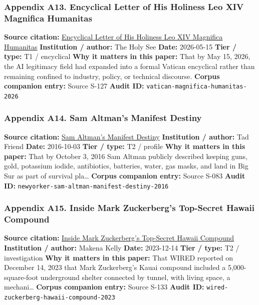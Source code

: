 \documentclass[
  american,
  11pt,
  letterpaper,
]{article}
\begin{document}
\subsubsection{Appendix A13. Encyclical Letter of His Holiness Leo XIV
Magnifica
Humanitas}\label{appendix-a13-encyclical-letter-of-his-holiness-leo-xiv-magnifica-humanitas}

\textbf{Source citation:}
\href{https://www.vatican.va/content/leo-xiv/en/encyclicals/documents/20260515-magnifica-humanitas.html}{Encyclical
Letter of His Holiness Leo XIV Magnifica Humanitas} \textbf{Institution
/ author:} The Holy See \textbf{Date:} 2026-05-15 \textbf{Tier / type:}
T1 / encyclical \textbf{Why it matters in this paper:} That by May 15,
2026, the AI legitimacy field had expanded into a formal Vatican
encyclical rather than remaining confined to industry, policy, or
technical discourse. \textbf{Corpus companion entry:} Source S-127
\textbf{Audit ID:} \texttt{vatican-magnifica-humanitas-2026}

\subsubsection{Appendix A14. Sam Altman's Manifest
Destiny}\label{appendix-a14-sam-altman-s-manifest-destiny}

\textbf{Source citation:}
\href{https://www.newyorker.com/magazine/2016/10/10/sam-altmans-manifest-destiny}{Sam
Altman's Manifest Destiny} \textbf{Institution / author:} Tad Friend
\textbf{Date:} 2016-10-03 \textbf{Tier / type:} T2 / profile \textbf{Why
it matters in this paper:} That by October 3, 2016 Sam Altman publicly
described keeping guns, gold, potassium iodide, antibiotics, batteries,
water, gas masks, and land in Big Sur as part of survival pla\ldots{}
\textbf{Corpus companion entry:} Source S-083 \textbf{Audit ID:}
\texttt{newyorker-sam-altman-manifest-destiny-2016}

\subsubsection{Appendix A15. Inside Mark Zuckerberg's Top-Secret Hawaii
Compound}\label{appendix-a15-inside-mark-zuckerbergs-top-secret-hawaii-compound}

\textbf{Source citation:}
\href{https://www.wired.com/story/mark-zuckerberg-inside-hawaii-compound}{Inside
Mark Zuckerberg's Top-Secret Hawaii Compound} \textbf{Institution /
author:} Makena Kelly \textbf{Date:} 2023-12-14 \textbf{Tier / type:} T2
/ investigation \textbf{Why it matters in this paper:} That WIRED
reported on December 14, 2023 that Mark Zuckerberg's Kauai compound
included a 5,000-square-foot underground shelter connected by tunnel,
with living space, a mechani\ldots{} \textbf{Corpus companion entry:}
Source S-133 \textbf{Audit ID:}
\texttt{wired-zuckerberg-hawaii-compound-2023}
\end{document}

